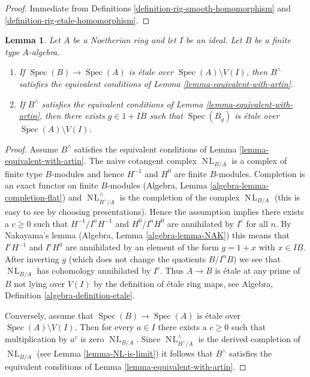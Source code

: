 \documentclass{stacks-project}
\theoremstyle{plain}
\newtheorem{lemma}[subsection]{Lemma}
\theoremstyle{definition}
\theoremstyle{remark}
\numberwithin{equation}{subsection}
\def\Spec{\mathop{\mathrm{Spec}}}
\def\NL{\mathop{N\!L}\nolimits}
\begin{document}
\begin{proof}
Immediate from Definitions \ref{definition-rig-smooth-homomorphism} and
\ref{definition-rig-etale-homomorphism}.
\end{proof}

\begin{lemma}
\label{lemma-rig-etale}
Let $A$ be a Noetherian ring and let $I$ be an ideal.
Let $B$ be a finite type $A$-algebra.
\begin{enumerate}
\item If $\Spec(B) \to \Spec(A)$ is \'etale over $\Spec(A) \setminus V(I)$,
then $B^\wedge$ satisfies the equivalent conditions of
Lemma \ref{lemma-equivalent-with-artin}.
\item If $B^\wedge$ satisfies the equivalent conditions of
Lemma \ref{lemma-equivalent-with-artin},
then there exists $g \in 1 + IB$ such that $\Spec(B_g)$ is \'etale
over $\Spec(A) \setminus V(I)$.
\end{enumerate}
\end{lemma}

\begin{proof}
Assume $B^\wedge$ satisfies the equivalent conditions of
Lemma \ref{lemma-equivalent-with-artin}.
The naive cotangent complex $\NL_{B/A}$ is a complex of finite type
$B$-modules and hence $H^{-1}$ and $H^0$ are finite $B$-modules.
Completion is an exact functor on finite $B$-modules (Algebra,
Lemma \ref{algebra-lemma-completion-flat}) and $\NL_{B^\wedge/A}^\wedge$
is the completion of the complex $\NL_{B/A}$ (this is easy to see
by choosing presentations).
Hence the assumption implies there exists a $c \geq 0$ such that
$H^{-1}/I^nH^{-1}$ and $H^0/I^nH^0$ are annihilated by $I^c$
for all $n$. By Nakayama's lemma (Algebra, Lemma \ref{algebra-lemma-NAK})
this means that $I^cH^{-1}$ and $I^cH^0$ are annihilated by an element
of the form $g = 1 + x$ with $x \in IB$. After inverting $g$
(which does not change the quotients $B/I^nB$)
we see that $\NL_{B/A}$ has cohomology annihilated by $I^c$. Thus
$A \to B$ is \'etale at any prime of $B$ not lying over $V(I)$
by the definition of \'etale ring maps, see
Algebra, Definition \ref{algebra-definition-etale}.

\medskip\noindent
Conversely, assume that $\Spec(B) \to \Spec(A)$ is \'etale over
$\Spec(A) \setminus V(I)$. Then for every $a \in I$ there exists
a $c \geq 0$ such that multiplication by $a^c$ is zero $\NL_{B/A}$.
Since $\NL_{B^\wedge/A}^\wedge$ is the derived completion of
$\NL_{B/A}$ (see Lemma \ref{lemma-NL-is-limit}) it follows that
$B^\wedge$ satisfies the equivalent conditions of
Lemma \ref{lemma-equivalent-with-artin}.
\end{proof}
\end{document}
